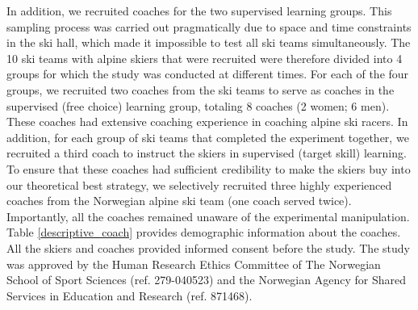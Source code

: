 \documentclass[pdflatex,sn-nature]{sn-jnl}%
\theoremstyle{thmstyleone}%
\theoremstyle{thmstyletwo}%
\theoremstyle{thmstylethree}%
\begin{document}
In addition, we recruited coaches for the two supervised learning groups. This sampling process was carried out pragmatically due to space and time constraints in the ski hall, which made it impossible to test all ski teams simultaneously. The 10 ski teams with alpine skiers that were recruited were therefore divided into 4 groups for which the study was conducted at different times. For each of the four groups, we recruited two coaches from the ski teams to serve as coaches in the supervised (free choice) learning group, totaling 8 coaches (2 women; 6 men). These coaches had extensive coaching experience in coaching alpine ski racers. In addition, for each group of ski teams that completed the experiment together, we recruited a third coach to instruct the skiers in supervised (target skill) learning. To ensure that these coaches had sufficient credibility to make the skiers buy into our theoretical best strategy, we selectively recruited three highly experienced coaches from the Norwegian alpine ski team (one coach served twice). Importantly, all the coaches remained unaware of the experimental manipulation. Table \ref{descriptive_coach} provides demographic information about the coaches. All the skiers and coaches provided informed consent before the study. The study was approved by the Human Research Ethics Committee of The Norwegian School of Sport Sciences (ref. 279-040523) and the Norwegian Agency for Shared Services in Education and Research (ref. 871468).
\end{document}
